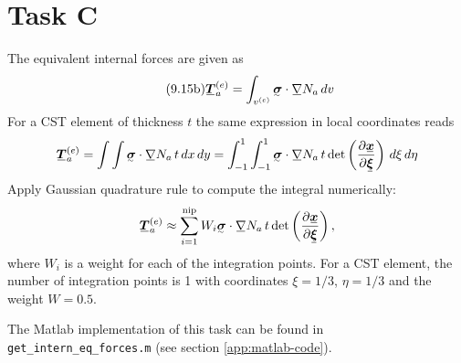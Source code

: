 \section{Task C}
\label{sec:task-c}

The equivalent internal forces are given as
\begin{equation} \tag{9.15b}
  \label{eq:int-force}
  \ubar{\bm{T}}_{a}^{(e)} = \int_{v^{(e)}} \utilde{\sigma} \cdot \ubar{\nabla} N_{a}\, dv
\end{equation}
For a CST element of thickness \(t\) the same expression in local coordinates reads 
\begin{equation}
  \label{eq:int-force-local}
  \ubar{\bm{T}}_{a}^{(e)} = \int \int \utilde{\sigma} \cdot \ubar{\nabla} N_{a} \, t 
  \, dx \, dy =
  \int_{-1}^{1} \int_{-1}^{1} \utilde{\sigma} \cdot \ubar{\nabla} N_{a} \, t 
  \det \left( \frac{\partial \ubar{\bm{x}}}{\partial \ubar{\bm{\xi}}} \right) \,
  d\xi \, d\eta
\end{equation}
Apply Gaussian quadrature rule to compute the integral numerically:
\begin{equation}
  \label{eq:int-force-numer}
  \ubar{\bm{T}}_{a}^{(e)} \approx
  \sum_{i=1}^{\text{nip}} W_{i} \utilde{\sigma} \cdot \ubar{\nabla} N_{a} \, t 
  \det \left( \frac{\partial \ubar{\bm{x}}}{\partial \ubar{\bm{\xi}}} \right),
\end{equation}
where \(W_{i}\) is a weight for each of the integration points.
For a CST element, the number of integration points is 1 with coordinates
\(\xi = 1/3\), \(\eta = 1/3\) and the weight \(W = 0.5\).

The Matlab implementation of this task can be found in 
\texttt{get\_intern\_eq\_forces.m} (see section \ref{app:matlab-code}).

